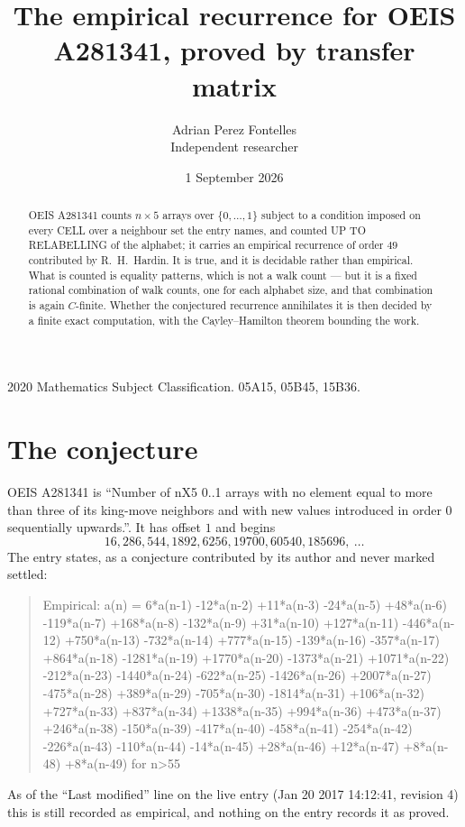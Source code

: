\documentclass[11pt,a4paper]{article}
\title{The empirical recurrence for OEIS A281341, proved by transfer matrix}
\author{Adrian Perez Fontelles\\ \small Independent researcher}
\date{1 September 2026}
\theoremstyle{plain}
\theoremstyle{definition}
\begin{document}
\maketitle

\begin{abstract}
OEIS A281341 counts $n\times5$ arrays over $\{0,\dots,1\}$ subject to a condition imposed on
every CELL over a neighbour set the entry names, and counted UP TO RELABELLING of the
alphabet; it carries an empirical recurrence of order $49$ contributed by
R.~H.~Hardin. It is true, and it is decidable rather than empirical. What is counted is
equality patterns, which is not a walk count --- but it is a fixed rational combination of
walk counts, one for each alphabet size, and that combination is again $C$-finite. Whether the
conjectured recurrence annihilates it is then decided by a finite exact computation, with the
Cayley--Hamilton theorem bounding the work.
\end{abstract}

\noindent\small 2020 Mathematics Subject Classification. 05A15, 05B45, 15B36.\normalsize

\section{The conjecture}

OEIS A281341 is ``Number of nX5 0..1 arrays with no element equal to more than three of its king-move neighbors and with new values introduced in order 0 sequentially upwards.''. It has offset $1$ and begins
\[
16, 286, 544, 1892, 6256, 19700, 60540, 185696,\ \dots
\]
The entry states, as a conjecture contributed by its author and never marked settled:
\begin{quote}
Empirical: a(n) = 6*a(n-1) -12*a(n-2) +11*a(n-3) -24*a(n-5) +48*a(n-6) -119*a(n-7) +168*a(n-8) -132*a(n-9) +31*a(n-10) +127*a(n-11) -446*a(n-12) +750*a(n-13) -732*a(n-14) +777*a(n-15) -139*a(n-16) -357*a(n-17) +864*a(n-18) -1281*a(n-19) +1770*a(n-20) -1373*a(n-21) +1071*a(n-22) -212*a(n-23) -1440*a(n-24) -622*a(n-25) -1426*a(n-26) +2007*a(n-27) -475*a(n-28) +389*a(n-29) -705*a(n-30) -1814*a(n-31) +106*a(n-32) +727*a(n-33) +837*a(n-34) +1338*a(n-35) +994*a(n-36) +473*a(n-37) +246*a(n-38) -150*a(n-39) -417*a(n-40) -458*a(n-41) -254*a(n-42) -226*a(n-43) -110*a(n-44) -14*a(n-45) +28*a(n-46) +12*a(n-47) +8*a(n-48) +8*a(n-49) for n>55
\end{quote}
As of the ``Last modified'' line on the live entry (Jan 20 2017 14:12:41, revision 4) this is still
recorded as empirical, and nothing on the entry records it as proved.
\end{document}
